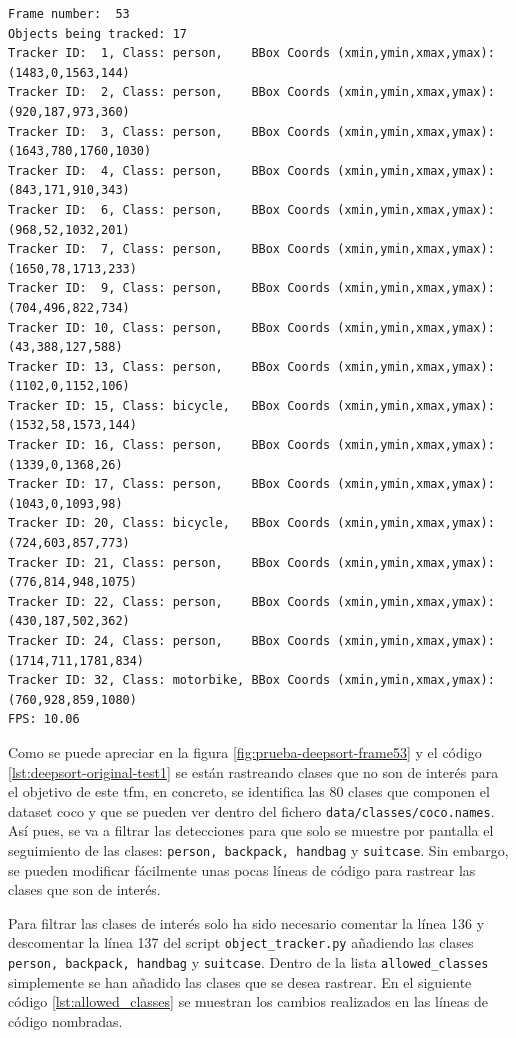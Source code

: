 \vspace{0.5cm}
\begin{lstlisting}[language=iPython,caption=Prueba test del seguimiento de objetos Deep SORT y YOLOv4,captionpos=b,label={lst:deepsort-original-test1}]
Frame number:  53
Objects being tracked: 17
Tracker ID:  1, Class: person,    BBox Coords (xmin,ymin,xmax,ymax): (1483,0,1563,144)
Tracker ID:  2, Class: person,    BBox Coords (xmin,ymin,xmax,ymax): (920,187,973,360)
Tracker ID:  3, Class: person,    BBox Coords (xmin,ymin,xmax,ymax): (1643,780,1760,1030)
Tracker ID:  4, Class: person,    BBox Coords (xmin,ymin,xmax,ymax): (843,171,910,343)
Tracker ID:  6, Class: person,    BBox Coords (xmin,ymin,xmax,ymax): (968,52,1032,201)
Tracker ID:  7, Class: person,    BBox Coords (xmin,ymin,xmax,ymax): (1650,78,1713,233)
Tracker ID:  9, Class: person,    BBox Coords (xmin,ymin,xmax,ymax): (704,496,822,734)
Tracker ID: 10, Class: person,    BBox Coords (xmin,ymin,xmax,ymax): (43,388,127,588)
Tracker ID: 13, Class: person,    BBox Coords (xmin,ymin,xmax,ymax): (1102,0,1152,106)
Tracker ID: 15, Class: bicycle,   BBox Coords (xmin,ymin,xmax,ymax): (1532,58,1573,144)
Tracker ID: 16, Class: person,    BBox Coords (xmin,ymin,xmax,ymax): (1339,0,1368,26)
Tracker ID: 17, Class: person,    BBox Coords (xmin,ymin,xmax,ymax): (1043,0,1093,98)
Tracker ID: 20, Class: bicycle,   BBox Coords (xmin,ymin,xmax,ymax): (724,603,857,773)
Tracker ID: 21, Class: person,    BBox Coords (xmin,ymin,xmax,ymax): (776,814,948,1075)
Tracker ID: 22, Class: person,    BBox Coords (xmin,ymin,xmax,ymax): (430,187,502,362)
Tracker ID: 24, Class: person,    BBox Coords (xmin,ymin,xmax,ymax): (1714,711,1781,834)
Tracker ID: 32, Class: motorbike, BBox Coords (xmin,ymin,xmax,ymax): (760,928,859,1080)
FPS: 10.06
\end{lstlisting}

Como se puede apreciar en la figura \ref{fig:prueba-deepsort-frame53} y el código \ref{lst:deepsort-original-test1} se están rastreando clases que no son de interés para el objetivo de este \gls{tfm}, en concreto, se identifica las 80 clases que componen el dataset \gls{coco} y que se pueden ver dentro del fichero \texttt{data/classes/coco.names}. Así pues, se va a filtrar las detecciones para que solo se muestre por pantalla el seguimiento de las clases: \texttt{person, backpack, handbag} y \texttt{suitcase}. Sin embargo, se pueden modificar fácilmente unas pocas líneas de código para rastrear las clases que son de interés.

Para filtrar las clases de interés solo ha sido necesario comentar la línea 136 y descomentar la línea 137 del script \texttt{object\_tracker.py} \cite{yolov4-deepsort} añadiendo las clases \texttt{person, backpack, handbag} y \texttt{suitcase}. Dentro de la lista \texttt{allowed\_classes} simplemente se han añadido las clases que se desea rastrear. En el siguiente código \ref{lst:allowed_classes} se muestran los cambios realizados en las líneas de código nombradas.

